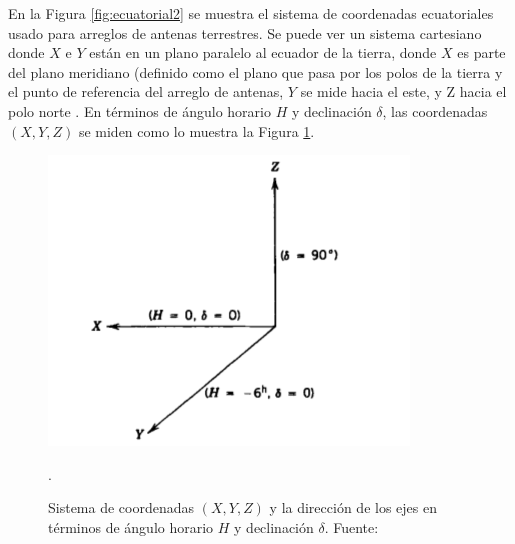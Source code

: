 En la Figura \ref{fig:ecuatorial2} se muestra el sistema de coordenadas ecuatoriales usado para arreglos de antenas terrestres. Se puede ver un sistema cartesiano donde $X$ e $Y$ están en un plano paralelo al ecuador de la tierra, donde $X$ es parte del plano meridiano (definido como el plano que pasa por los polos de la tierra y el punto de referencia del arreglo de antenas, $Y$ se mide hacia el este, y Z hacia el polo norte \citep{libroAstro}. En términos de ángulo horario $H$ y declinación $\delta$, las coordenadas $(X,Y,Z)$ se miden como lo muestra la Figura \ref{fig:ecuatorial1}.
\begin{figure}[h!]
\centering
\includegraphics[scale=0.6]{images/ecuatorial1.png}
\caption{Sistema de coordenadas $(X,Y,Z)$ y la dirección de los ejes en términos de ángulo horario $H$ y declinación $\delta$. Fuente: \citep{libroAstro}}.
\label{fig:ecuatorial1}
\end{figure}

